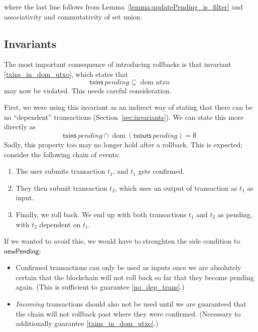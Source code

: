 \documentclass{article}
\DeclareMathOperator{\dom}{dom}
\begin{document}
where the last line follows from Lemma~\ref{lemma:updatePending_is_filter} and
associativity and commutativity of set union.

\subsection{Invariants}

The most important consequence of introducing rollbacks is that invariant
\eqref{txins_in_dom_utxo}, which states that
%
\begin{equation*}
\mathsf{txins} ~ pending \subseteq \dom utxo
\end{equation*}
%
may now be violated. This needs careful consideration.

First, we were using this invariant as an indirect way of stating that there
can be no ``dependent'' transactions (Section~\ref{sec:invariants}). We can
state this more directly as
%
\begin{equation} \label{no_dep_trans}
\mathsf{txins} ~ \mathit{pending} \cap \dom (\mathsf{txouts} ~ \mathit{pending}) = \emptyset
\end{equation}
%
Sadly, this property too may no longer hold after a rollback. This is expected;
consider the following chain of events:
%
\begin{enumerate}
\item The user submits transaction $t_1$, and $t_1$ gets confirmed.
\item They then submit transaction $t_2$, which uses an output of transaction as $t_1$ as input.
\item Finally, we roll back. We end up with both transactions $t_1$ and $t_2$ as pending, with $t_2$ dependent on $t_1$.
\end{enumerate}

If we wanted to avoid this, we would have to strenghten the side condition to
$\mathsf{newPending}$:

\begin{itemize}
\item Confirmed transactions can only be used as inputs once we are absolutely
certain that the blockchain will not roll back so far that they become pending
again. (This is sufficient to guarantee \eqref{no_dep_trans}.)
\item \emph{Incoming} transactions should also not be used until we are guaranteed
that the chain will not rollback past where they were confirmed. (Necessary to
additionally guarantee \eqref{txins_in_dom_utxo}.)
\end{itemize}
\end{document}
